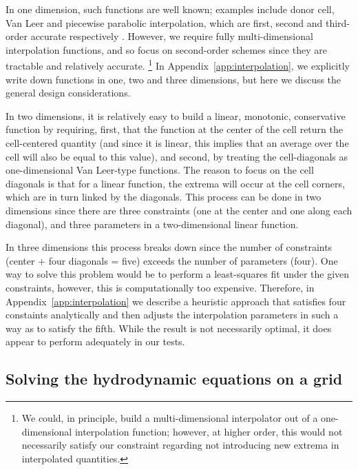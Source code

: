 In one dimension, such functions are well known; examples include
donor cell, Van Leer and piecewise parabolic interpolation, which are
first, second and third-order accurate respectively
\citep[e.g.,][]{Stone92a}.  However, we require fully
multi-dimensional interpolation functions, and so focus on
second-order schemes since they are tractable and relatively accurate.
\footnote{We could, in principle, build a multi-dimensional
  interpolator out of a one-dimensional interpolation function;
  however, at higher order, this would not necessarily satisfy our
  constraint regarding not introducing new extrema in interpolated quantities.}  In Appendix~\ref{app:interpolation}, we
explicitly write down functions in one, two and three dimensions, but
here we discuss the general design considerations.

In two dimensions, it is relatively easy to build a linear, monotonic,
conservative function by requiring, first, that the function at the
center of the cell return the cell-centered quantity (and since it is
linear, this implies that an average over the cell will also be equal
to this value), and second, by treating the cell-diagonals as
one-dimensional Van Leer-type functions.  The reason to focus on the
cell diagonals is that for a linear function, the extrema will occur at the cell 
corners, which are in turn linked by the diagonals.  This process can be done in
two dimensions since there are three constraints (one at the center and one along
each diagonal), and three parameters in a two-dimensional linear
function.

In three dimensions this process breaks down since the number of
constraints (center + four diagonals = five) exceeds the number of
parameters (four).  One way to solve this problem would be to perform
a least-squares fit under the given constraints, however, this is
computationally too expensive.  Therefore, in Appendix~\ref{app:interpolation} we describe
a heuristic approach that satisfies four constaints analytically and
then adjusts the interpolation parameters in such a way as to satisfy the fifth.
While the result is not necessarily optimal, it does appear to perform
adequately in our tests.


\subsection{Solving the hydrodynamic equations on a grid}
\label{sec:solve_hydro}

